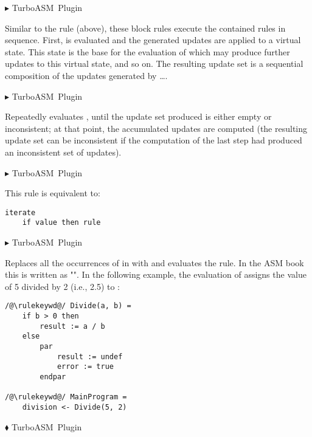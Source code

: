 \documentclass{article}
\makeatletter
\newcommand{\ruleform}[2]{\pform{$\blacktriangleright$}{#1}{#2}}
\newcommand{\funcform}[2]{\pform{$\blacklozenge$}{#1}{#2}}
\newcommand{\pform}[3]{\vspace*{4mm} \noindent #1 #2 \vspace{1mm}\textcolor[gray]{0.7}{\dotfill}\mbox{{\sffamily \footnotesize #3}}}
\newcommand{\indexrule}[1]{\index{#1 rule@\asm{#1} rule}}
\makeatother
\begin{document}
\ruleform{
}{TurboASM Plugin}

Similar to the  rule (above), these block rules execute the contained rules in sequence. First,  is evaluated and the generated updates are applied to a virtual state. This state is the base for the evaluation of  which may produce further updates to this virtual state, and so on.
The resulting update set is a sequential composition of the updates generated by  \ldots {}.

\ruleform{
}{TurboASM Plugin}

Repeatedly evaluates , until the update set produced is either empty or inconsistent; at that point, 
the accumulated updates are computed (the resulting update set can be inconsistent if the computation of 
the last step had produced an inconsistent set of updates). 

\ruleform{
}{TurboASM Plugin}
\indexrule{while}

This rule is equivalent to:

\begin{lstlisting}
iterate
	if value then rule
\end{lstlisting}

\ruleform{
}{TurboASM Plugin}

Replaces all the occurrences of  in  with  and
evaluates the rule. In the ASM book this is written as "".
In the following example, the evaluation of
 assigns the value of 5 divided by 2 (i.e., 2.5) to
:

\begin{lstlisting}
/@\rulekeywd@/ Divide(a, b) =
	if b > 0 then
		result := a / b
	else
		par
			result := undef
			error := true
		endpar
		
/@\rulekeywd@/ MainProgram =
	division <- Divide(5, 2)
\end{lstlisting}

\funcform{
}{TurboASM Plugin}
\end{document}
